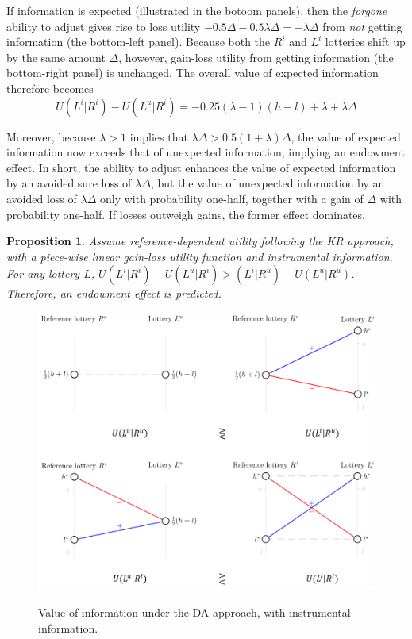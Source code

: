 \documentclass[12pt]{article}
\newtheorem{prop}{Proposition}
\begin{document}
If information is expected (illustrated in the botoom panels), then the \emph{forgone} ability to adjust gives rise to loss utility $-0.5\Delta - 0.5 \lambda \Delta = -\lambda \Delta$ from \emph{not} getting information (the bottom-left panel). Because both the $R^i$ and $L^i$ lotteries shift up by the same amount $\Delta$, however, gain-loss utility from getting information (the bottom-right panel) is unchanged. The overall value of expected information therefore becomes
\begin{equation*}
  U(L^i|R^i)-U(L^u|R^i)=-0.25(\lambda-1)(h-l)+\lambda +\lambda \Delta
\end{equation*}

Moreover, because $\lambda>1$ implies that $\lambda \Delta > 0.5(1+\lambda)\Delta$, the value of expected information now exceeds that of unexpected information, implying an endowment effect. In short, the ability to adjust enhances the value of expected information by an avoided sure loss of $\lambda \Delta$, but the value of unexpected information by an avoided loss of $\lambda \Delta$ only with probability one-half, together with a gain of $\Delta$ with probability one-half. If losses outweigh gains, the former effect dominates.

\FloatBarrier

\begin{prop}
  Assume reference-dependent utility following the KR approach, with a piece-wise linear gain-loss utility function and instrumental information. For any lottery $L$, $U(L^i|R^i)-U(L^u|R^i)>(L^i|R^u)-U(L^u|R^u)$. Therefore, an endowment effect is predicted.
  \label{prop:instrumental-KR}
\end{prop}

\begin{figure}[ht]
  \caption{Value of information under the DA approach, with instrumental information.}\label{fig:instrumental-KR}
  \begin{center}
  {\includegraphics[width=1\textwidth]{./figures/theory_fig4.png}}
  \end{center}
\end{figure}
\end{document}
